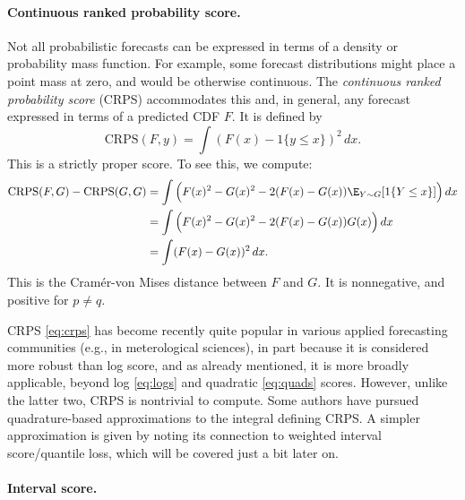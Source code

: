 \documentclass{article}
\begin{document}
\paragraph{Continuous ranked probability score.}

Not all probabilistic forecasts can be expressed in terms of a density or
probability mass function. For example, some forecast distributions might place
a point mass at zero, and would be otherwise continuous. The \emph{continuous
  ranked probability score} (CRPS) accommodates this and, in general, any
forecast expressed in terms of a predicted CDF $F$. It is defined by 
\begin{equation}
\label{eq:crps}
\mathrm{CRPS}(F, y) = \int (F(x) - 1\{y \leq x\})^2 \, dx. 
\end{equation}
This is a strictly proper score. To see this, we compute: 
\begin{align*}
\mathrm{CRPS}(F, G) - \mathrm{CRPS}(G ,G) 
&= \int \Big( F(x)^2 - G(x)^2 - 2(F(x) - G(x)) \E_{Y \sim G}[ 1\{Y \leq x\} ]
  \Big) \, dx \\
&= \int \Big( F(x)^2 - G(x)^2 - 2(F(x) - G(x)) G(x) \Big) \, dx \\
&= \int (F(x) - G(x))^2 \, dx.
\end{align*}
This is the Cram{\'e}r-von Mises distance between $F$ and $G$. It is
nonnegative, and positive for $p \not= q$.   

CRPS \eqref{eq:crps} has become recently quite popular in various applied
forecasting communities (e.g., in meterological sciences), in part because it is
considered more robust than log score, and as already mentioned, it is more
broadly applicable, beyond log \eqref{eq:logs} and quadratic \eqref{eq:quads}
scores. However, unlike the latter two, CRPS is nontrivial to compute. Some
authors have pursued quadrature-based approximations to the integral defining
CRPS. A simpler approximation is given by noting its connection to weighted
interval score/quantile loss, which will be covered just a bit later on.

\paragraph{Interval score.}
\end{document}
